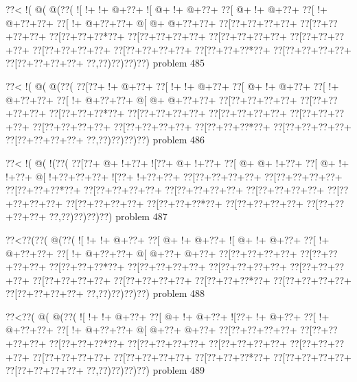 \vbox{\vbox{\goo
\0??<\- !(\- @(\- @(\0??(
\- ![\- !+\- !+\- @+\0??+
\- ![\- @+\- !+\- @+\0??+
\0??[\- @+\- !+\- @+\0??+
\0??[\- !+\- @+\0??+\0??+
\0??[\- !+\- @+\0??+\0??+
\- @[\- @+\- @+\0??+\0??+
\0??[\0??+\0??+\0??+\0??+
\0??[\0??+\0??+\0??+\0??+
\0??[\0??+\0??+\0??*\0??+
\0??[\0??+\0??+\0??+\0??+
\0??[\0??+\0??+\0??+\0??+
\0??[\0??+\0??+\0??+\0??+
\0??[\0??+\0??+\0??+\0??+
\0??[\0??+\0??+\0??+\0??+
\0??[\0??+\0??+\0??*\0??+
\0??[\0??+\0??+\0??+\0??+
\0??[\0??+\0??+\0??+\0??+
\0??,\0??)\0??)\0??)\0??)
}
\hfil problem 485\hfil\break
}

\vbox{\vbox{\goo
\0??<\- !(\- @(\- @(\0??(
\0??[\0??+\- !+\- @+\0??+
\0??[\- !+\- !+\- @+\0??+
\0??[\- @+\- !+\- @+\0??+
\0??[\- !+\- @+\0??+\0??+
\0??[\- !+\- @+\0??+\0??+
\- @[\- @+\- @+\0??+\0??+
\0??[\0??+\0??+\0??+\0??+
\0??[\0??+\0??+\0??+\0??+
\0??[\0??+\0??+\0??*\0??+
\0??[\0??+\0??+\0??+\0??+
\0??[\0??+\0??+\0??+\0??+
\0??[\0??+\0??+\0??+\0??+
\0??[\0??+\0??+\0??+\0??+
\0??[\0??+\0??+\0??+\0??+
\0??[\0??+\0??+\0??*\0??+
\0??[\0??+\0??+\0??+\0??+
\0??[\0??+\0??+\0??+\0??+
\0??,\0??)\0??)\0??)\0??)
}
\hfil problem 486\hfil\break
}

\vbox{\vbox{\goo
\0??<\- !(\- @(\- !(\0??(
\0??[\0??+\- @+\- !+\0??+
\- ![\0??+\- @+\- !+\0??+
\0??[\- @+\- @+\- !+\0??+
\0??[\- @+\- !+\- !+\0??+
\- @[\- !+\0??+\0??+\0??+
\- ![\0??+\- !+\0??+\0??+
\0??[\0??+\0??+\0??+\0??+
\0??[\0??+\0??+\0??+\0??+
\0??[\0??+\0??+\0??*\0??+
\0??[\0??+\0??+\0??+\0??+
\0??[\0??+\0??+\0??+\0??+
\0??[\0??+\0??+\0??+\0??+
\0??[\0??+\0??+\0??+\0??+
\0??[\0??+\0??+\0??+\0??+
\0??[\0??+\0??+\0??*\0??+
\0??[\0??+\0??+\0??+\0??+
\0??[\0??+\0??+\0??+\0??+
\0??,\0??)\0??)\0??)\0??)
}
\hfil problem 487\hfil\break
}

\vbox{\vbox{\goo
\0??<\0??(\0??(\- @(\0??(
\- ![\- !+\- !+\- @+\0??+
\0??[\- @+\- !+\- @+\0??+
\- ![\- @+\- !+\- @+\0??+
\0??[\- !+\- @+\0??+\0??+
\0??[\- !+\- @+\0??+\0??+
\- @[\- @+\0??+\- @+\0??+
\0??[\0??+\0??+\0??+\0??+
\0??[\0??+\0??+\0??+\0??+
\0??[\0??+\0??+\0??*\0??+
\0??[\0??+\0??+\0??+\0??+
\0??[\0??+\0??+\0??+\0??+
\0??[\0??+\0??+\0??+\0??+
\0??[\0??+\0??+\0??+\0??+
\0??[\0??+\0??+\0??+\0??+
\0??[\0??+\0??+\0??*\0??+
\0??[\0??+\0??+\0??+\0??+
\0??[\0??+\0??+\0??+\0??+
\0??,\0??)\0??)\0??)\0??)
}
\hfil problem 488\hfil\break
}

\vbox{\vbox{\goo
\0??<\0??(\- @(\- @(\0??(
\- ![\- !+\- !+\- @+\0??+
\0??[\- @+\- !+\- @+\0??+
\- ![\0??+\- !+\- @+\0??+
\0??[\- !+\- @+\0??+\0??+
\0??[\- !+\- @+\0??+\0??+
\- @[\- @+\0??+\- @+\0??+
\0??[\0??+\0??+\0??+\0??+
\0??[\0??+\0??+\0??+\0??+
\0??[\0??+\0??+\0??*\0??+
\0??[\0??+\0??+\0??+\0??+
\0??[\0??+\0??+\0??+\0??+
\0??[\0??+\0??+\0??+\0??+
\0??[\0??+\0??+\0??+\0??+
\0??[\0??+\0??+\0??+\0??+
\0??[\0??+\0??+\0??*\0??+
\0??[\0??+\0??+\0??+\0??+
\0??[\0??+\0??+\0??+\0??+
\0??,\0??)\0??)\0??)\0??)
}
\hfil problem 489\hfil\break
}

